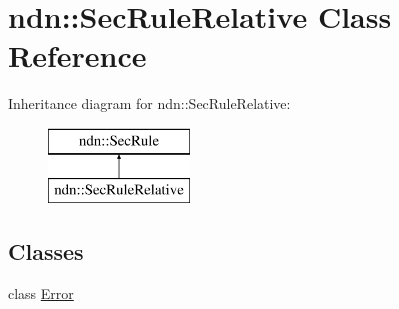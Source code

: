\hypertarget{classndn_1_1SecRuleRelative}{}\section{ndn\+:\+:Sec\+Rule\+Relative Class Reference}
\label{classndn_1_1SecRuleRelative}
Inheritance diagram for ndn\+:\+:Sec\+Rule\+Relative\+:\begin{figure}[H]
\begin{center}
\leavevmode
\includegraphics[height=2.000000cm]{classndn_1_1SecRuleRelative}
\end{center}
\end{figure}
\subsection*{Classes}
\begin{DoxyCompactItemize}
\item 
class \hyperlink{classndn_1_1SecRuleRelative_1_1Error}{Error}
\end{DoxyCompactItemize}
